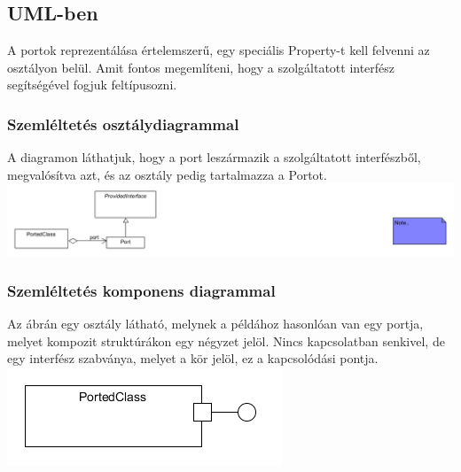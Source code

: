 \documentclass[a4paper,12pt]{report}
\begin{document}
\subsection{UML-ben}
A portok reprezentálása értelemszerű, egy speciális Property-t kell felvenni az osztályon belül. Amit fontos megemlíteni, hogy a szolgáltatott interfész segítségével fogjuk feltípusozni. 


\subsubsection{Szemléltetés osztálydiagrammal}
A diagramon láthatjuk, hogy a port leszármazik a szolgáltatott interfészből, megvalósítva azt, és az osztály pedig tartalmazza a Portot.
\includegraphics[scale=0.8]{uml_port_class.png}

\subsubsection{Szemléltetés komponens diagrammal}
Az ábrán egy osztály látható, melynek a példához hasonlóan van egy portja, melyet kompozit struktúrákon egy négyzet jelöl. Nincs kapcsolatban senkivel, de egy interfész szabványa, melyet a kör jelöl, ez a kapcsolódási pontja.
\includegraphics[scale=0.7]{uml_port_comp.png}
\end{document}
